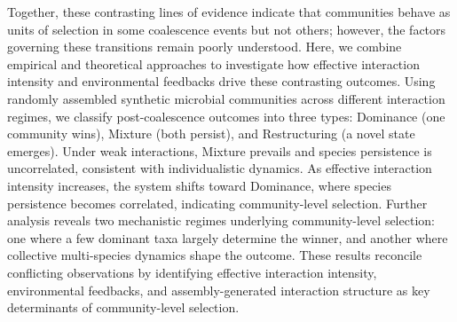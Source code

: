 Together, these contrasting lines of evidence indicate that communities behave as units of selection in some coalescence events but not others; however, the factors governing these transitions remain poorly understood. Here, we combine empirical and theoretical approaches to investigate how effective interaction intensity and environmental feedbacks drive these contrasting outcomes. Using randomly assembled synthetic microbial communities across different interaction regimes, we classify post-coalescence outcomes into three types: Dominance (one community wins), Mixture (both persist), and Restructuring (a novel state emerges). Under weak interactions, Mixture prevails and species persistence is uncorrelated, consistent with individualistic dynamics. As effective interaction intensity increases, the system shifts toward Dominance, where species persistence becomes correlated, indicating community-level selection.  Further analysis reveals two mechanistic regimes underlying community-level selection: one where a few dominant taxa largely determine the winner, and another where collective multi-species dynamics shape the outcome. These results reconcile conflicting observations by identifying effective interaction intensity, environmental feedbacks, and assembly-generated interaction structure as key determinants of community-level selection.
